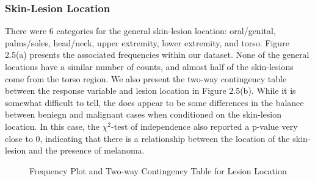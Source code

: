 \documentclass [MAS] {uclathes}
\begin{document}
\subsubsection*{Skin-Lesion Location}

There were 6 categories for the general skin-lesion location: oral/genital, palms/soles, head/neck, upper extremity, lower extremity, and torso. Figure 2.5(a) presents the associated frequencies within our dataset. None of the general locations have a similar number of counts, and almost half of the skin-lesions come from the torso region. We also present the two-way contingency table between the response variable and lesion location in Figure 2.5(b). While it is somewhat difficult to tell, the does appear to be some differences in the balance between beniegn and malignant cases when conditioned on the skin-lesion location. In this case, the $\chi^2$-test of independence also reported a p-value very close to 0, indicating that there is a relationship between the location of the skin-lesion and the presence of melanoma.

\begin{figure}[h!tbp]
    \hspace*{\fill}
    \centering
    \hspace{1em}
    \hspace*{\fill}
    \label{fig:sex_eda}
    \vspace{0cm}
    \caption{Frequency Plot and Two-way Contingency Table for Lesion Location}
    \end{figure}
\end{document}
